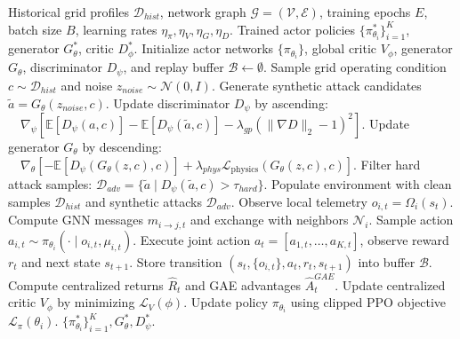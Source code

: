 \documentclass[journal,compsoc]{IEEEtran}
\begin{document}
\begin{algorithm}[!t]
\caption{Physics-Constrained Generative Curriculum Training with CTDE MAPPO}
\label{alg:ctde_marl}
\begin{algorithmic}[1]
\REQUIRE Historical grid profiles $\mathcal{D}_{hist}$, network graph $\mathcal{G} = (\mathcal{V}, \mathcal{E})$, training epochs $E$, batch size $B$, learning rates $\eta_\pi, \eta_V, \eta_G, \eta_D$.
\ENSURE Trained actor policies $\{\pi_{\theta_i}^*\}_{i=1}^K$, generator $G_\theta^*$, critic $D_\phi^*$.
\STATE Initialize actor networks $\{\pi_{\theta_i}\}$, global critic $V_\phi$, generator $G_\theta$, discriminator $D_\psi$, and replay buffer $\mathcal{B} \leftarrow \emptyset$.
    \STATE Sample grid operating condition $c \sim \mathcal{D}_{hist}$ and noise $z_{noise} \sim \mathcal{N}(0, I)$.
    \STATE Generate synthetic attack candidates $\tilde{a} = G_\theta(z_{noise}, c)$.
    \STATE Update discriminator $D_\psi$ by ascending:
    \STATE $\quad \nabla_\psi \left[ \mathbb{E}[D_\psi(a, c)] - \mathbb{E}[D_\psi(\tilde{a}, c)] - \lambda_{gp} (\|\nabla D\|_2 - 1)^2 \right]$.
    \STATE Update generator $G_\theta$ by descending:
    \STATE $\quad \nabla_\theta \left[ -\mathbb{E}[D_\psi(G_\theta(z, c), c)] + \lambda_{phys} \mathcal{L}_{\text{physics}}(G_\theta(z, c), c) \right]$.
    \STATE Filter hard attack samples: $\mathcal{D}_{adv} = \{\tilde{a} \mid D_\psi(\tilde{a}, c) > \tau_{hard}\}$.
    \STATE Populate environment with clean samples $\mathcal{D}_{hist}$ and synthetic attacks $\mathcal{D}_{adv}$.
            \STATE Observe local telemetry $o_{i,t} = \Omega_i(s_t)$.
            \STATE Compute GNN messages $m_{i \to j, t}$ and exchange with neighbors $\mathcal{N}_i$.
            \STATE Sample action $a_{i,t} \sim \pi_{\theta_i}(\cdot \mid o_{i,t}, \mu_{i,t})$.
        \ENDFOR
        \STATE Execute joint action $a_t = [a_{1,t}, \dots, a_{K,t}]$, observe reward $r_t$ and next state $s_{t+1}$.
        \STATE Store transition $(s_t, \{o_{i,t}\}, a_t, r_t, s_{t+1})$ into buffer $\mathcal{B}$.
    \ENDFOR
    \STATE Compute centralized returns $\hat{R}_t$ and GAE advantages $\hat{A}_t^{GAE}$.
    \STATE Update centralized critic $V_\phi$ by minimizing $\mathcal{L}_V(\phi)$.
        \STATE Update policy $\pi_{\theta_i}$ using clipped PPO objective $\mathcal{L}_\pi(\theta_i)$.
    \ENDFOR
\ENDFOR
\RETURN $\{\pi_{\theta_i}^*\}_{i=1}^K, G_\theta^*, D_\psi^*$.
\end{algorithmic}
\end{algorithm}
\end{document}
